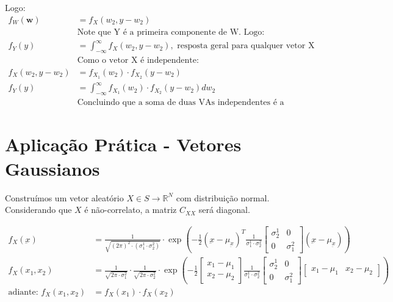 \documentclass{article}
\renewcommand\u[1]{\underbar{#1}}
\begin{document}
Logo:
\begin{align*}
    f_W(\mathbf{w}) &= f_X(w_2, y-w_2) \\
           &\text{Note que Y é a primeira componente de W. Logo:} \\
    f_Y(y) &= \int_{-\infty}^{\infty} f_X(w_2, y-w_2), \text{ resposta geral para qualquer vetor X} \\
           &\text{Como o vetor X é independente:} \\
    f_X(w_2, y-w_2) &= f_{X_1}(w_2) \cdot f_{X_2}(y-w_2) \\
    f_Y(y) &= \int_{-\infty}^{\infty} f_{X_1}(w_2) \cdot f_{X_2}(y-w_2) dw_2 \\
           &\text{Concluindo que a soma de duas VAs independentes é a convolução das PDFs originais!}
\end{align*}

\newpage
\section{Aplicação Prática - Vetores Gaussianos}
Construímos um vetor aleatório $X \in S \to \mathbb{R}^N$ com distribuição
normal. Considerando que $X$ é não-correlato, a matriz $C_{XX}$ será
diagonal.

\begin{align*}
    f_X(\u{x}) &= \frac{1}{\sqrt{(2 \pi)^2 \cdot (\sigma_1^1 \cdot
    \sigma_2^2)}} \cdot
    \exp\left({-\frac{1}{2} (\u{x}-\mu_{\u{x}})^T \frac{1}{\sigma_1^1 \cdot
    \sigma_2^2}
    \begin{bmatrix}
        \sigma^1_2 & 0\\
        0 & \sigma^2_1
    \end{bmatrix}
    (\u{x}-\mu_{\u{x}})}\right) \\
    f_X(x_1,x_2) &= \frac{1}{\sqrt{2\pi\cdot\sigma_1^2}} \cdot
    \frac{1}{\sqrt{2\pi\cdot\sigma_2^2}} \cdot
    \exp\left(-\frac{1}{2}
        \begin{bmatrix} x_1-\mu_1 \\ x_2-\mu_2 \end{bmatrix}
        \frac{1}{\sigma_1^1 \cdot \sigma_2^2}
        \begin{bmatrix} \sigma^1_2 & 0\\ 0 & \sigma^2_1 \end{bmatrix}
        \begin{bmatrix} x_1-\mu_1 & x_2-\mu_2 \end{bmatrix} \right)
        \\
        \text{adiante: } f_X(x_1,x_2) &= f_X(x_1) \cdot f_X(x_2)
\end{align*}
\end{document}
